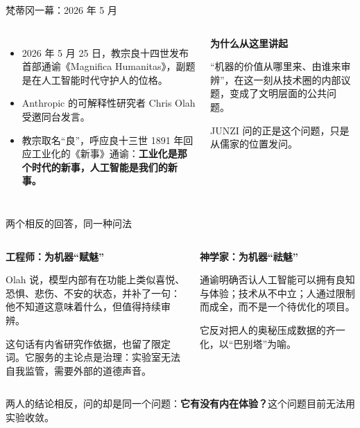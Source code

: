 \documentclass[aspectratio=169,11pt,fontset=fandol]{ctexbeamer}
\newcommand{\hl}[1]{{\bfseries\color{cinnabar}#1}}       %
\newcommand{\hg}[1]{{\bfseries\color{golddeep}#1}}       %
\begin{document}
\begin{frame}[t]{梵蒂冈一幕：2026 年 5 月}
\begin{columns}[T,onlytextwidth]
\begin{itemize}\setlength{\itemsep}{5pt}
\item 2026 年 5 月 25 日，教宗良十四世发布首部通谕《Magnifica Humanitas》，副题是在人工智能时代守护人的位格。
\item Anthropic 的可解释性研究者 Chris Olah 受邀同台发言。
\item 教宗取名“良”，呼应良十三世 1891 年回应工业化的《新事》通谕：\hg{工业化是那个时代的新事，人工智能是我们的新事。}
\end{itemize}
\begin{remark}
\small\textbf{为什么从这里讲起}\par\vspace{3pt}
“机器的价值从哪里来、由谁来审辨”，在这一刻从技术圈的内部议题，变成了文明层面的公共问题。\par\vspace{3pt}
JUNZI 问的正是这个问题，只是从儒家的位置发问。
\end{remark}
\end{columns}
\end{frame}

\begin{frame}[t]{两个相反的回答，同一种问法}
\begin{columns}[T,onlytextwidth]
\begin{thesis}
\hg{工程师：为机器“赋魅”}\par\vspace{3pt}
\small Olah 说，模型内部有在功能上类似喜悦、恐惧、悲伤、不安的状态，并补了一句：他不知道这意味着什么，但值得持续审辨。\par\vspace{3pt}
这句话有内省研究作依据，也留了限定词。它服务的主论点是治理：实验室无法自我监管，需要外部的道德声音。
\end{thesis}
\begin{thesis}
\hg{神学家：为机器“祛魅”}\par\vspace{3pt}
\small 通谕明确否认人工智能可以拥有良知与体验；技术从不中立；人通过限制而成全，而不是一个待优化的项目。\par\vspace{3pt}
它反对把人的奥秘压成数据的齐一化，以“巴别塔”为喻。
\end{thesis}
\end{columns}
\vspace{5pt}
\begin{caution}
\small 两人的结论相反，问的却是同一个问题：\hl{它有没有内在体验？}这个问题目前无法用实验收敛。
\end{caution}
\end{frame}
\end{document}
